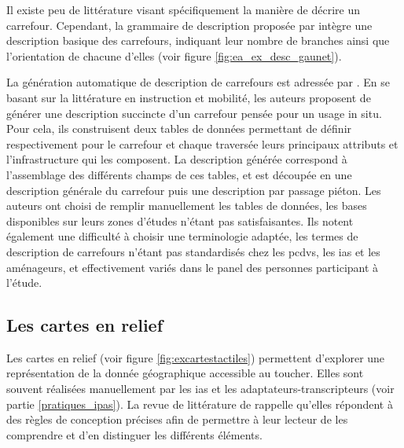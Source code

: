 

\newpar{}

Il existe peu de littérature visant spécifiquement la manière de décrire un carrefour. Cependant, la grammaire de description proposée par \citet{gaunet_verbal_2006} intègre une description basique des carrefours, indiquant leur nombre de branches ainsi que l'orientation de chacune d'elles (voir figure \ref{fig:ea_ex_desc_gaunet}).

\newpage{}

La génération automatique de description de carrefours est adressée par \citet{Guth2019}. En se basant sur la littérature en instruction et mobilité, les auteurs proposent de générer une description succincte d'un carrefour pensée pour un usage in situ. Pour cela, ils construisent deux tables de données permettant de définir respectivement pour le carrefour et chaque traversée leurs principaux attributs et l'infrastructure qui les composent. La description générée correspond à l'assemblage des différents champs de ces tables, et est découpée en une description générale du carrefour puis une description par passage piéton. Les auteurs ont choisi de remplir manuellement les tables de données, les bases disponibles sur leurs zones d'études n'étant pas satisfaisantes. Ils notent également une difficulté à choisir une terminologie adaptée, les termes de description de carrefours n'étant pas standardisés chez les \glspl{pcdv}, les \glspl{ia} et les aménageurs, et effectivement variés dans le panel des personnes participant à l'étude.

\subsection{Les cartes en relief}

Les cartes en relief (voir figure \ref{fig:excartestactiles}) permettent d'explorer une représentation de la donnée géographique accessible au toucher. Elles sont souvent réalisées manuellement par les \glspl{ia} et les adaptateurs-transcripteurs (voir partie \ref{pratiques_ipas}). La revue de littérature de \citet{Wabinski2022} rappelle qu'elles répondent à des règles de conception précises afin de permettre à leur lecteur de les comprendre et d'en distinguer les différents éléments.

